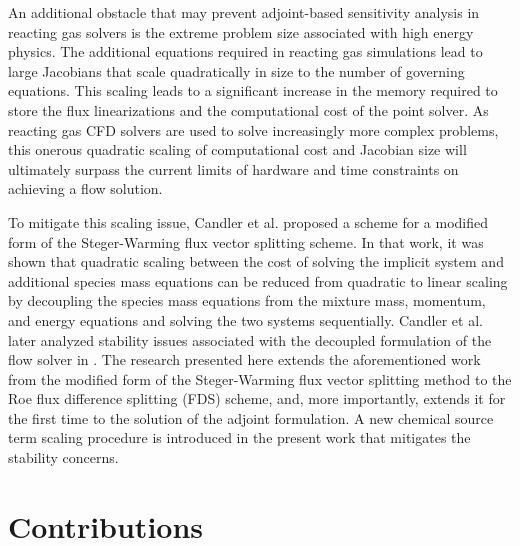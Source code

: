 An additional obstacle that may prevent adjoint-based sensitivity analysis in
reacting gas solvers is the extreme problem size associated with high energy
physics.  The additional equations required in reacting gas simulations lead to
large Jacobians that scale quadratically in size to the number of governing
equations.  This scaling leads to a significant increase in the memory required
to store the flux linearizations and the computational cost of the point solver.
As reacting gas CFD solvers are used to solve increasingly more complex
problems, this onerous quadratic scaling of computational cost and Jacobian size
will ultimately surpass the current limits of hardware and time constraints on
achieving a flow solution\cite{fischer}.

To mitigate this scaling issue, Candler et al.\cite{candler} proposed a scheme
for a modified form of the Steger-Warming flux vector splitting
scheme\cite{MacCormack,Steger}. In that work, it was shown that quadratic
scaling between the cost of solving the implicit system and additional species
mass equations can be reduced from quadratic to linear scaling by decoupling the
species mass equations from the mixture mass, momentum, and energy equations and
solving the two systems sequentially.  Candler et al.\cite{candler2013analysis}
later analyzed stability issues associated with the decoupled formulation of the
flow solver in \cite{candler}.  The research presented here extends the
aforementioned work\cite{candler} from the modified form of the Steger-Warming
flux vector splitting method to the Roe flux difference splitting (FDS) scheme,
and, more importantly, extends it for the first time to the solution of the
adjoint formulation.  A new chemical source term scaling procedure is introduced
in the present work that mitigates the stability concerns.

\section{Contributions}

